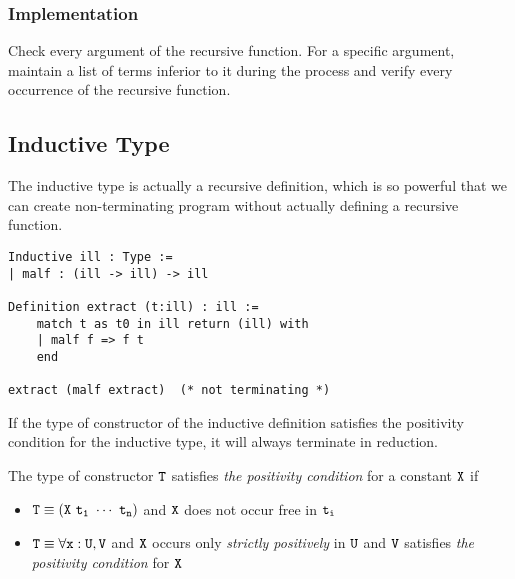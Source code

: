 \subsubsection*{Implementation}

Check every argument of the recursive function. For a specific argument, maintain a list of terms inferior to it 
during the process and verify every occurrence of the recursive function.

\subsection{Inductive Type}

The inductive type is actually a recursive definition, which is so powerful that we can create non-terminating program
without actually defining a recursive function.
\begin{center}
\begin{minipage}{0.7\textwidth}
\begin{verbatim}
Inductive ill : Type :=                
| malf : (ill -> ill) -> ill           
                                       
Definition extract (t:ill) : ill :=       
    match t as t0 in ill return (ill) with 
    | malf f => f t
    end                                     

extract (malf extract)  (* not terminating *)
\end{verbatim}
\end{minipage}
\end{center}

\begin{Prop}
If the type of constructor of the inductive definition satisfies the positivity condition for
the inductive type, it will always terminate in reduction.
\end{Prop}

\begin{Def}[Positivity]
The type of constructor $\tt T$ satisfies \textit{the positivity condition} for a constant $\tt X$ if
\begin{itemize}\normalfont
    \item $\tt T\equiv (X\ t_1\ \cdots\ t_n)$ and $\tt X$ does not occur free in $\tt t_i$
    \item $\tt T\equiv \forall x:U,V$ and $\tt X$ occurs only \textit{strictly positively} in $\tt U$ and
        $\tt V$ satisfies \textit{the positivity condition} for $\tt X$
\end{itemize}
\end{Def}

